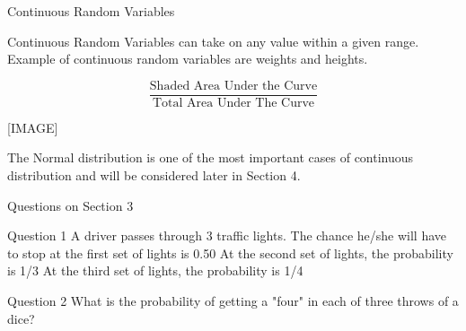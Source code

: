 
Continuous Random Variables



Continuous Random Variables can take on any value within a given range. Example of continuous random variables are weights and heights.


\[  \frac{\mbox{Shaded Area Under the Curve}}{ \mbox{Total Area Under The Curve}}  \]

[IMAGE]


The Normal distribution is one of the most important cases of continuous distribution and will be considered later in Section 4.




Questions on Section 3


Question 1
A driver passes through 3 traffic lights. The chance he/she will have to stop at the first set of lights is 0.50
At the second set of lights, the probability is 1/3
At the third set of lights, the probability is 1/4

Question 2
What is the probability of getting a "four" in each of three throws of a dice?
